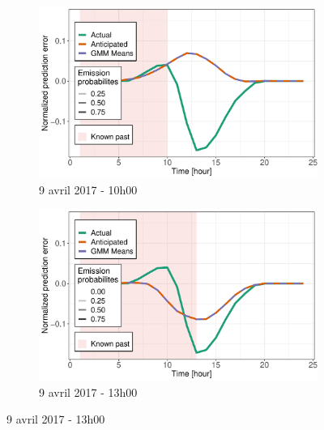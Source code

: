 \documentclass[12pt, french]{report}
\begin{document}
\begin{figure}[htbp] 
	\begin{subfigure}[b]{0.5\linewidth}
		\centering
		\includegraphics[width=0.9\linewidth]{Images/PV/GMM/GMM_6Clust_Intraday_24d_10h_idtest98.pdf} 
		\caption{9 avril 2017 - 10h00} 
	\end{subfigure}%
	\begin{subfigure}[b]{0.5\linewidth}
		\centering
		\includegraphics[width=0.9\linewidth]{Images/PV/GMM/GMM_6Clust_Intraday_24d_13h_idtest98.pdf} 
		\caption{9 avril 2017 - 13h00} 
	\end{subfigure}
	

\end{figure}
\end{document}
